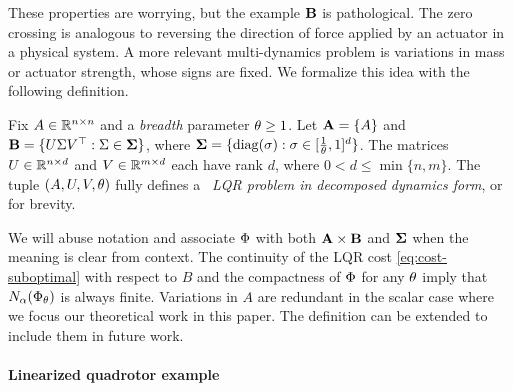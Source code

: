 These properties are worrying, but the example $\mathbf{B}$ is pathological.
The zero crossing is analogous to reversing the direction of force applied by an actuator in a physical system.
A more relevant multi-dynamics problem is variations
in mass or actuator strength,
whose signs are fixed.
We formalize this idea with the following definition.
\begin{definition}
\label{def:B-SVD}
	Fix $A \in \mathbb{R}^{n \times n}$
	and a \emph{breadth} parameter $\theta \geq 1$.
	Let $\mathbf{A} = \{ A \}$ and
		$\mathbf{B} = \{ U \Sigma V^\top : \Sigma \in \boldsymbol\Sigma \}$,
		where
		$\boldsymbol\Sigma = \{ \operatorname{diag}(\sigma) : \sigma \in [\frac{1}{\theta}, 1]^d \}$.
	The matrices $U \in \mathbb{R}^{n \times d}$
	and
	$V \in \mathbb{R}^{m \times d}$ each have rank $d$, where
	$0 < d \leq \min \{n, m\}$.
	The tuple $(A, U, V, \theta)$
	fully defines a \emph{\multienv\ LQR problem in decomposed dynamics form},
	or \emph{\DDFproblem} for brevity.
\end{definition}

We will abuse notation and associate $\Phi$ with both $\mathbf{A} \times \mathbf{B}$ and $\boldsymbol\Sigma$
when the meaning is clear from context.
The continuity of the LQR cost \eqref{eq:cost-suboptimal} with respect to $B$
and the compactness of $\Phi$ for any $\theta$ imply that
$N_{\alpha}(\Phi_\theta)$ is always finite.
Variations in $A$ are redundant in the scalar case where we focus our theoretical work in this paper.
The definition can be extended to include them in future work.




\paragraph{Linearized quadrotor example}

